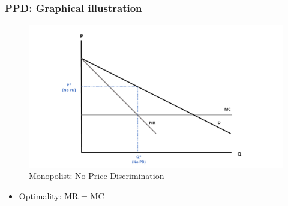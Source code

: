 \documentclass[10pt]{beamer}
\begin{document}
\begin{frame} 
	\frametitle{PPD: Graphical illustration}


 \begin{figure}[H]
	\centering
	\includegraphics[width=0.9\linewidth]{no_pd}
	\caption{Monopolist: No Price Discrimination \\ 
\label{fig:nopd}}

\end{figure}

\begin{itemize}
	\item Optimality: MR = MC
\end{itemize}

	
\end{frame}
\end{document}
